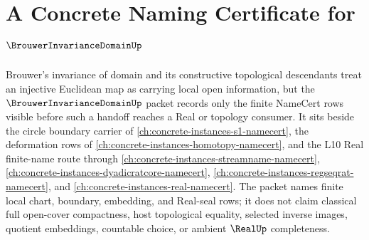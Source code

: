 \chapter{A Concrete Naming Certificate for $\BrouwerInvarianceDomainUp$}
\label{ch:concrete-instances-brouwer-invariance-domain-namecert}

Brouwer's invariance of domain and its constructive topological descendants treat an injective Euclidean map as carrying local open information, but the $\BrouwerInvarianceDomainUp$ packet records only the finite NameCert rows visible before such a handoff reaches a Real or topology consumer. It sits beside the circle boundary carrier of \autoref{ch:concrete-instances-s1-namecert}, the deformation rows of \autoref{ch:concrete-instances-homotopy-namecert}, and the L10 Real finite-name route through \autoref{ch:concrete-instances-streamname-namecert}, \autoref{ch:concrete-instances-dyadicratcore-namecert}, \autoref{ch:concrete-instances-regseqrat-namecert}, and \autoref{ch:concrete-instances-real-namecert}. The packet names finite local chart, boundary, embedding, and Real-seal rows; it does not claim classical full open-cover compactness, host topological equality, selected inverse images, quotient embeddings, countable choice, or ambient $\RealUp$ completeness.

